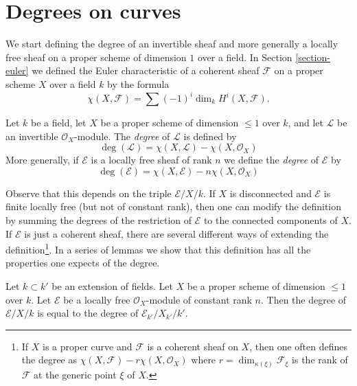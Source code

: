 \section{Degrees on curves}
\label{section-divisors-curves}

\noindent
We start defining the degree of an invertible sheaf and more generally
a locally free sheaf on a proper scheme
of dimension $1$ over a field. In Section \ref{section-euler}
we defined the Euler characteristic
of a coherent sheaf $\mathcal{F}$ on a proper scheme $X$ over a field
$k$ by the formula
$$
\chi(X, \mathcal{F}) = \sum (-1)^i \dim_k H^i(X, \mathcal{F}).
$$

\begin{definition}
\label{definition-degree-invertible-sheaf}
Let $k$ be a field, let $X$ be a proper scheme of dimension $\leq 1$
over $k$, and let $\mathcal{L}$ be an invertible $\mathcal{O}_X$-module.
The {\it degree} of $\mathcal{L}$ is defined by
$$
\deg(\mathcal{L}) = \chi(X, \mathcal{L}) - \chi(X, \mathcal{O}_X)
$$
More generally, if $\mathcal{E}$ is a locally free sheaf of rank $n$
we define the {\it degree} of $\mathcal{E}$ by
$$
\deg(\mathcal{E}) = \chi(X, \mathcal{E}) - n\chi(X, \mathcal{O}_X)
$$
\end{definition}

\noindent
Observe that this depends on the triple $\mathcal{E}/X/k$.
If $X$ is disconnected and $\mathcal{E}$ is finite locally free (but not
of constant rank), then one can modify the definition by summing the degrees
of the restriction of $\mathcal{E}$ to the connected components of $X$.
If $\mathcal{E}$ is just a coherent sheaf, there are several different
ways of extending the definition\footnote{If $X$ is a proper curve
and $\mathcal{F}$ is a coherent sheaf on $X$, then one often defines
the degree as $\chi(X, \mathcal{F}) - r\chi(X, \mathcal{O}_X)$
where $r = \dim_{\kappa(\xi)} \mathcal{F}_\xi$ is the rank of $\mathcal{F}$
at the generic point $\xi$ of $X$.}.
In a series of lemmas we show that this definition has all the properties
one expects of the degree.

\begin{lemma}
\label{lemma-degree-base-change}
Let $k \subset k'$ be an extension of fields. Let $X$ be a proper scheme of
dimension $\leq 1$ over $k$. Let $\mathcal{E}$ be a locally free
$\mathcal{O}_X$-module of constant rank $n$. Then the degree of
$\mathcal{E}/X/k$ is equal to the degree of
$\mathcal{E}_{k'}/X_{k'}/k'$.
\end{lemma}

